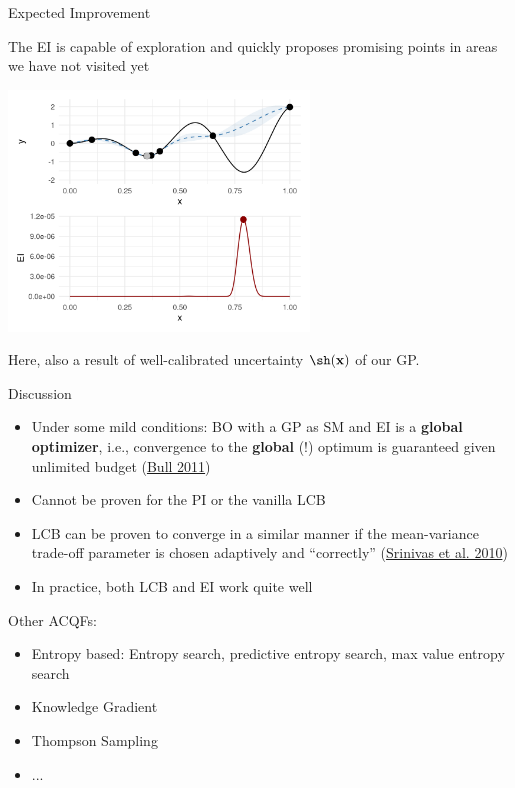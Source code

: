 \documentclass[11pt,compress,t,notes=noshow, xcolor=table]{beamer}
\begin{document}
\begin{frame}{Expected Improvement}

The EI is capable of exploration and quickly proposes promising points in areas we have not visited yet

\begin{center}
  \includegraphics[width = 0.6\textwidth]{figure_man/bayesian_loop_6.png}
\end{center}

Here, also a result of well-calibrated uncertainty $\sh(\xv)$ of our GP.

\end{frame}

\begin{frame}{Discussion}

\begin{itemize}
  \item Under some mild conditions: BO with a GP as SM and EI is a \textbf{global optimizer}, i.e., convergence to the \textbf{global} (!) optimum is guaranteed given unlimited budget (\href{https://dl.acm.org/doi/pdf/10.5555/1953048.2078198}{Bull 2011})
  \item Cannot be proven for the PI or the vanilla LCB
  \item LCB can be proven to converge in a similar manner if the mean-variance trade-off parameter is chosen adaptively and ``correctly'' (\href{https://icml.cc/Conferences/2010/papers/422.pdf}{Srinivas et al. 2010})
  \item In practice, both LCB and EI work quite well
\end{itemize}

\vspace*{0.3cm}

Other ACQFs:
\begin{itemize}
  \item Entropy based: Entropy search, predictive entropy search, max value entropy search
  \item Knowledge Gradient
  \item Thompson Sampling
  \item ...
\end{itemize}

\end{frame}

\endlecture
\end{document}
